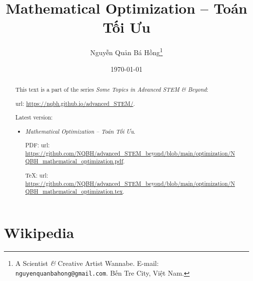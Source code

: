 \documentclass{article}
\title{Mathematical Optimization -- Toán Tối Ưu}
\author{Nguyễn Quản Bá Hồng\footnote{A Scientist {\it\&} Creative Artist Wannabe. E-mail: {\tt nguyenquanbahong@gmail.com}. Bến Tre City, Việt Nam.}}
\date{\today}
\begin{document}
\maketitle
\begin{abstract}
	This text is a part of the series {\it Some Topics in Advanced STEM \& Beyond}:
	
	{\sc url}: \url{https://nqbh.github.io/advanced_STEM/}.
	
	Latest version:
	\begin{itemize}
		\item {\it Mathematical Optimization -- Toán Tối Ưu}.
		
		PDF: {\sc url}: \url{https://github.com/NQBH/advanced_STEM_beyond/blob/main/optimization/NQBH_mathematical_optimization.pdf}.
		
		\TeX: {\sc url}: \url{https://github.com/NQBH/advanced_STEM_beyond/blob/main/optimization/NQBH_mathematical_optimization.tex}.
	\end{itemize}
\end{abstract}
\tableofcontents


\section{Wikipedia}
\end{document}
